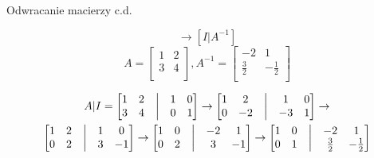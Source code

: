 \documentclass[polish,10pt]{beamer}
\begin{document}
\begin{frame}{Odwracanie macierzy c.d.}
    \begin{example}
\begin{equation*}
    [A|I] \to [I|A^{-1}]
\end{equation*}
    \begin{equation*}
    A = \begin{bmatrix}
        1 & 2 \\
        3 & 4 \\
        \end{bmatrix},
            A^{-1} = \begin{bmatrix}
         -2 & 1 \\
         \frac{3}{2} & -\frac{1}{2} \\
        \end{bmatrix}
    \end{equation*}   
    
    \begin{gather*}
    A|I = \begin{bmatrix}
        1 & 2 & \bigm| & 1 & 0 \\
        3 & 4 & \bigm| & 0 & 1 \\
        \end{bmatrix}
        \to
        \begin{bmatrix}
        1 & 2  & \bigm| &1  & 0 \\
        0 & -2 & \bigm| & -3 & 1 \\
        \end{bmatrix}
        \to \\
        \begin{bmatrix}
        1 & 2 &\bigm| & 1 & 0 \\
        0 & 2 &\bigm| & 3 & -1 \\
        \end{bmatrix}
        \to
        \begin{bmatrix}
        1 & 0 &\bigm| & -2 & 1 \\
        0 & 2 &\bigm| & 3 & -1 \\
        \end{bmatrix}
        \to
        \begin{bmatrix}
        1 & 0 &\bigm| &-2 & 1 \\
        0 & 1 &\bigm| &\frac{3}{2} & -\frac{1}{2} \\
        \end{bmatrix}
    \end{gather*}
    \end{example}
\end{frame}
\end{document}
